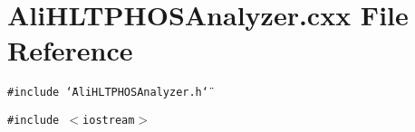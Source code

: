 \section{Ali\-HLTPHOSAnalyzer.cxx File Reference}
\label{AliHLTPHOSAnalyzer_8cxx}
{\tt \#include \char`\"{}Ali\-HLTPHOSAnalyzer.h\char`\"{}}\par
{\tt \#include $<$iostream$>$}\par
